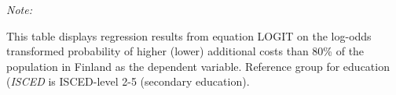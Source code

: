 \begin{table}[htbp!]
\begin{adjustbox}{width = 1\textwidth, max height = 0.95\textheight, center}
\begin{threeparttable}[b]
         \begin{tablenotes}\item \medskip \textit{Note:}
            \item This table displays regression results from equation LOGIT on the log-odds transformed probability of higher (lower) additional costs than 80\% of the population in Finland as the dependent variable. Reference group for education (\textit{ISCED} is ISCED-level 2-5 (secondary education).
         \end{tablenotes}
      \end{threeparttable}
   \end{adjustbox}
\end{table}



